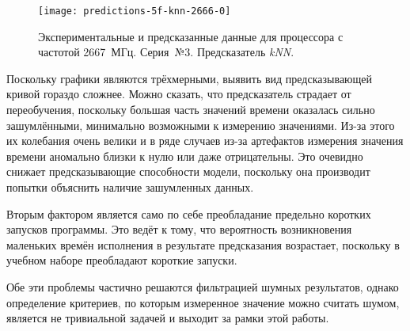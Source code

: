 \begin{figure}[H]
    \begin{center}
        \texttt{[image: predictions-5f-knn-2666-0]}
        \caption{Экспериментальные и предсказанные данные для процессора с частотой 2667~МГц. Серия~№3. Предсказатель \textit{kNN}.}
        \label{img:predictions-5f-knn-2666-0}
    \end{center}
\end{figure}

Поскольку графики являются трёхмерными, выявить вид предсказывающей кривой гораздо сложнее. Можно сказать, что предсказатель страдает от переобучения, поскольку большая часть значений времени оказалась сильно зашумлёнными, минимально возможными к измерению значениями. Из-за этого их колебания очень велики и в ряде случаев из-за артефактов измерения значения времени аномально близки к нулю или даже отрицательны. Это очевидно снижает предсказывающие способности модели, поскольку она производит попытки объяснить наличие зашумленных данных.

Вторым фактором является само по себе преобладание предельно коротких запусков программы. Это ведёт к тому, что вероятность возникновения маленьких времён исполнения в результате предсказания возрастает, поскольку в учебном наборе преобладают короткие запуски.

Обе эти проблемы частично решаются фильтрацией шумных результатов, однако определение критериев, по которым измеренное значение можно считать шумом, является не тривиальной задачей и выходит за рамки этой работы.